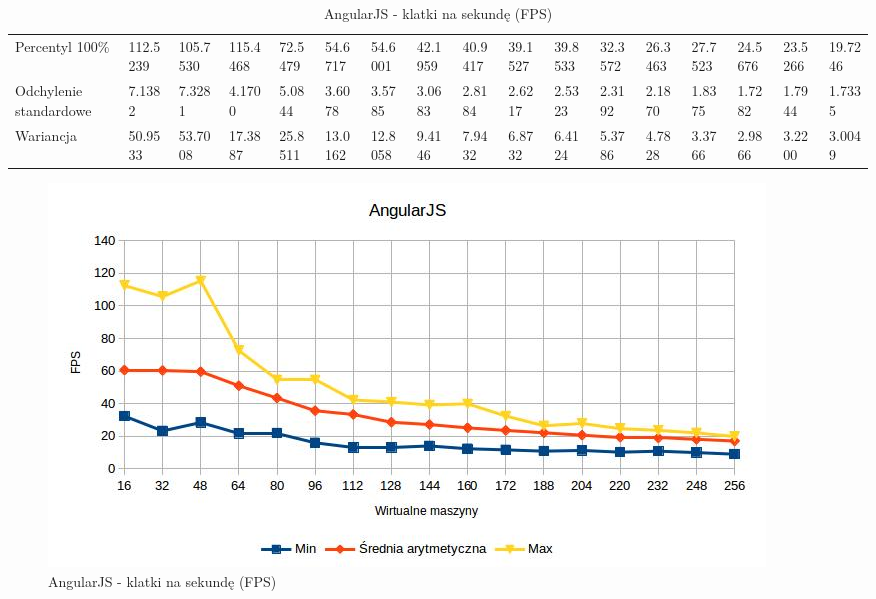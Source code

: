 \documentclass[polish, twoside, 12pt]{mwart}
\begin{document}
\begin{table}[]
{\begin{tabular}{@{}lllllllllllllllll@{}}
  Percentyl 100\%        & 112.5239 & 105.7530 & 115.4468 & 72.5479 & 54.6717 & 54.6001 & 42.1959 & 40.9417 & 39.1527 & 39.8533 & 32.3572 & 26.3463 & 27.7523 & 24.5676 & 23.5266 & 19.7246 \\
  Odchylenie standardowe & 7.1382   & 7.3281   & 4.1700   & 5.0844  & 3.6078  & 3.5785  & 3.0683  & 2.8184  & 2.6217  & 2.5323  & 2.3192  & 2.1870  & 1.8375  & 1.7282  & 1.7944  & 1.7335  \\
  Wariancja              & 50.9533  & 53.7008  & 17.3887  & 25.8511 & 13.0162 & 12.8058 & 9.4146  & 7.9432  & 6.8732  & 6.4124  & 5.3786  & 4.7828  & 3.3766  & 2.9866  & 3.2200  & 3.0049  \\ \bottomrule
  \end{tabular}%
  }
  \caption{AngularJS - klatki na sekundę (FPS)}
\end{table}

\begin{figure}[ht]
  \includegraphics[width=\textwidth]{angularjs-fps.jpg}
	\caption{AngularJS - klatki na sekundę (FPS)}
\end{figure}
\end{document}
